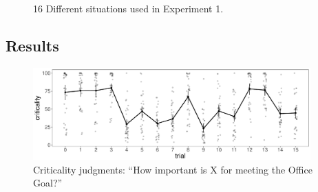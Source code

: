 \documentclass[11pt]{article}
\begin{document}
\begin{figure}[H]
\renewcommand{\thesubfigure}{\arabic{subfigure}}
\centering
{\hfill}
\hfill
{}
\hfill
{}
\hfill
{}
{\hfill}
\caption{16 Different situations used in Experiment 1.}
\end{figure}

\subsection{Results}
\label{sub:results}

\begin{figure}[H]
	\centering
	\includegraphics[width=0.95\textwidth]{criticality_judgments}
	\caption{Criticality judgments: ``How important is X for meeting the Office Goal?''}
	\label{fig:criticality_judgments}
\end{figure}
\end{document}
